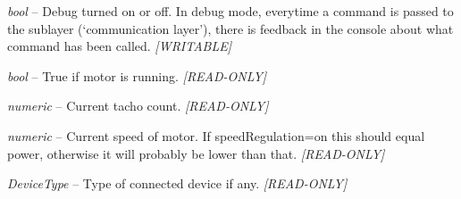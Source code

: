 \documentclass[letterpaper,10pt,english]{sphinxmanual}
\begin{document}
\begin{fulllineitems}
\begin{fulllineitems}
\end{fulllineitems}


\begin{fulllineitems}
\label{source:source.Motor.debug}
\emph{bool} -- Debug turned on or off. In debug mode, everytime a command is passed to
the sublayer (`communication layer'), there is feedback in the console about what
command has been called. \emph{{[}WRITABLE{]}}

\end{fulllineitems}


\begin{fulllineitems}
\label{source:source.Motor.isRunning}
\emph{bool} -- True if motor is running. \emph{{[}READ-ONLY{]}}

\end{fulllineitems}


\begin{fulllineitems}
\label{source:source.Motor.tachoCount}
\emph{numeric} -- Current tacho count. \emph{{[}READ-ONLY{]}}

\end{fulllineitems}


\begin{fulllineitems}
\label{source:source.Motor.currentSpeed}
\emph{numeric} -- Current speed of motor. If speedRegulation=on this should equal power,
otherwise it will probably be lower than that. \emph{{[}READ-ONLY{]}}

\end{fulllineitems}


\begin{fulllineitems}
\label{source:source.Motor.type}
\emph{DeviceType} -- Type of connected device if any. \emph{{[}READ-ONLY{]}}

\end{fulllineitems}



\end{fulllineitems}
\end{document}
